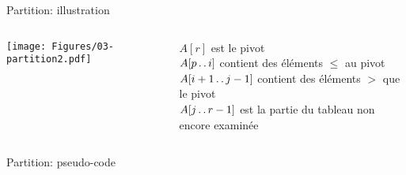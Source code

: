 \begin{frame}{Partition: illustration}

\begin{columns}
\begin{column}{4cm}
\centerline{\texttt{[image: Figures/03-partition2.pdf]}}
\end{column}
\begin{column}{6cm}\small
$A[r]$ est le pivot\\
$A[p\mathinner{\ldotp\ldotp} i]$ contient des éléments $\leq$ au pivot\\
$A[i+1\mathinner{\ldotp\ldotp} j-1]$ contient des éléments $>$ que le pivot\\
$A[j\mathinner{\ldotp\ldotp} r-1]$ est la partie du tableau non encore examinée
\end{column}
\end{columns}

\end{frame}

\begin{frame}{Partition: pseudo-code}

\begin{center}
\end{center}

\end{frame}

